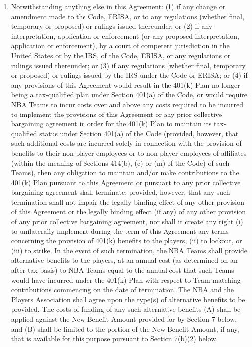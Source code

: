 \documentclass[
]{book}
\begin{document}
\begin{enumerate}
\item
  Notwithstanding anything else in this Agreement: (1) if any change or amendment made to the Code, ERISA, or to any regulations (whether final, temporary or proposed) or rulings issued thereunder; or (2) if any interpretation, application or enforcement (or any proposed interpretation, application or enforcement), by a court of competent jurisdiction in the United States or by the IRS, of the Code, ERISA, or any regulations or rulings issued thereunder; or (3) if any regulations (whether final, temporary or proposed) or rulings issued by the IRS under the Code or ERISA; or (4) if any provisions of this Agreement would result in the 401(k) Plan no longer being a tax-qualified plan under Section 401(a) of the Code, or would require NBA Teams to incur costs over and above any costs required to be incurred to implement the provisions of this Agreement or any prior collective bargaining agreement in order for the 401(k) Plan to maintain its tax-qualified status under Section 401(a) of the Code (provided, however, that such additional costs are incurred solely in connection with the provision of benefits to their non-player employees or to non-player employees of affiliates (within the meaning of Sections 414(b), (c) or (m) of the Code) of such Teams), then any obligation to maintain and/or make contributions to the 401(k) Plan pursuant to this Agreement or pursuant to any prior collective bargaining agreement shall terminate; provided, however, that any such termination shall not impair the legally binding effect of any other provision of this Agreement or the legally binding effect (if any) of any other provision of any prior collective bargaining agreement, nor shall it create any right (i) to unilaterally implement during the term of this Agreement any terms concerning the provision of 401(k) benefits to the players, (ii) to lockout, or (iii) to strike. In the event of such termination, the NBA Teams shall provide alternative benefits to the players, at an annual cost (as determined on an after-tax basis) to NBA Teams equal to the annual cost that such Teams would have incurred under the 401(k) Plan with respect to Team matching contributions commencing on the date of termination. The NBA and the Players Association shall agree upon the type(s) of alternative benefits to be provided. The costs of funding of any such alternative benefits (A) shall be applied against the New Benefit Amount provided for by Section 7 below, and (B) shall be limited to the portion of the New Benefit Amount, if any, that is available for this purpose pursuant to Section 7(b)(2) below.
\end{enumerate}
\end{document}
